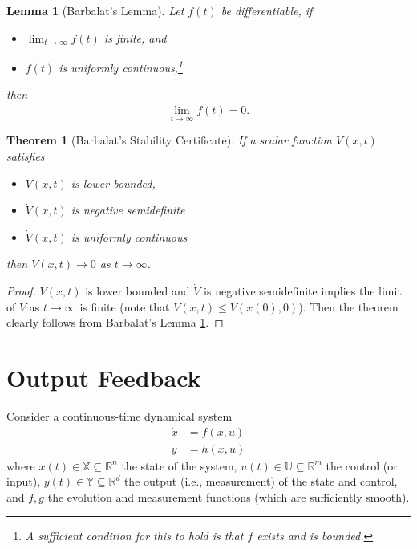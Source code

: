 \documentclass[
]{book}
\newtheorem{theorem}{Theorem}[chapter]
\newtheorem{lemma}{Lemma}[chapter]
\theoremstyle{definition}
\theoremstyle{definition}
\theoremstyle{definition}
\theoremstyle{definition}
\theoremstyle{remark}
\begin{document}
\begin{lemma}[Barbalat's Lemma]
\protect\hypertarget{lem:Barbalat}{}\label{lem:Barbalat}Let \(f(t)\) be differentiable, if

\begin{itemize}
\item
  \(\lim_{t \rightarrow \infty} f(t)\) is finite, and
\item
  \(\dot{f}(t)\) is uniformly continuous,\footnote{A sufficient condition for this to hold is that \(\ddot{f}\) exists and is bounded.}
\end{itemize}

then
\[
\lim_{t \rightarrow \infty} \dot{f}(t) = 0.
\]
\end{lemma}

\begin{theorem}[Barbalat's Stability Certificate]
\protect\hypertarget{thm:BarbalatStability}{}\label{thm:BarbalatStability}If a scalar function \(V(x,t)\) satisfies

\begin{itemize}
\item
  \(V(x,t)\) is lower bounded,
\item
  \(\dot{V}(x,t)\) is negative semidefinite
\item
  \(\dot{V}(x,t)\) is uniformly continuous
\end{itemize}

then \(\dot{V}(x,t) \rightarrow 0\) as \(t \rightarrow \infty\).
\end{theorem}

\begin{proof}
\(V(x,t)\) is lower bounded and \(\dot{V}\) is negative semidefinite implies the limit of \(V\) as \(t \rightarrow \infty\) is finite (note that \(V(x,t) \leq V(x(0),0)\)). Then the theorem clearly follows from Barbalat's Lemma \ref{lem:Barbalat}.
\end{proof}

\hypertarget{output-feedback}{%
\chapter{Output Feedback}\label{output-feedback}}

Consider a continuous-time dynamical system
\begin{equation}
\begin{split}
\dot{x} &= f(x,u)  \\
y &= h(x,u)
\end{split} 
\label{eq:output-feedback-system}
\end{equation}
where \(x(t) \in \mathbb{X} \subseteq \mathbb{R}^n\) the state of the system, \(u(t) \in \mathbb{U} \subseteq \mathbb{R}^m\) the control (or input), \(y(t) \in \mathbb{Y} \subseteq \mathbb{R}^{d}\) the output (i.e., measurement) of the state and control, and \(f,g\) the evolution and measurement functions (which are sufficiently smooth).
\end{document}
